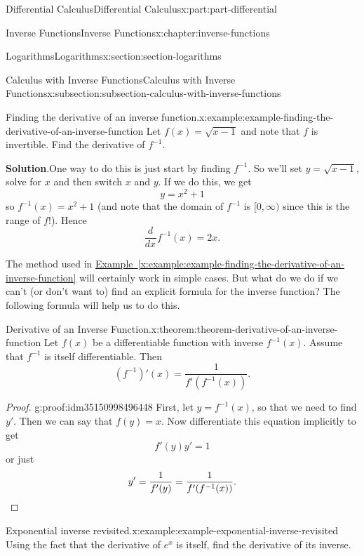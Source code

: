 \documentclass[twoside,10pt,]{book}
\newcommand{\blocktitlefont}{\relax}
\newcommand{\xreffont}{\relax}
\numberwithin{equation}{part}
\newcommand{\qedhere}{\relax}
\newcommand{\dv}[3][]{\dfrac{d^{#1} #2}{d #3^{#1}}}
\begin{document}
\begin{partptx}{Differential Calculus}{}{Differential Calculus}{}{}{x:part:part-differential}
\begin{chapterptx}{Inverse Functions}{}{Inverse Functions}{}{}{x:chapter:inverse-functions}
\begin{sectionptx}{Logarithms}{}{Logarithms}{}{}{x:section:section-logarithms}
\begin{subsectionptx}{Calculus with Inverse Functions}{}{Calculus with Inverse Functions}{}{}{x:subsection:subsection-calculus-with-inverse-functions}
\begin{example}{Finding the derivative of an inverse function.}{x:example:example-finding-the-derivative-of-an-inverse-function}
Let \(f(x) = \sqrt{x-1}\) and note that \(f\) is invertible. Find the derivative of \(f^{-1}\).%
\par\smallskip%
\noindent\textbf{\blocktitlefont Solution}.\hypertarget{g:solution:idm35150998439488}{}\quad{}One way to do this is just start by finding \(f^{-1}\). So we'll set \(y = \sqrt{x-1}\), solve for \(x\) and then switch \(x\) and \(y\). If we do this, we get%
\begin{equation*}
y = x^{2} + 1
\end{equation*}
so \(f^{-1}(x) = x^{2} + 1\) (and note that the domain of \(f^{-1}\) is \([0,\infty)\) since this is the range of \(f\)!). Hence%
\begin{equation*}
\dv{}{x}f^{-1}(x) = 2x.
\end{equation*}
%
\end{example}
The method used in \hyperref[x:example:example-finding-the-derivative-of-an-inverse-function]{Example~{\xreffont\ref{x:example:example-finding-the-derivative-of-an-inverse-function}}} will certainly work in simple cases. But what do we do if we can't (or don't want to) find an explicit formula for the inverse function? The following formula will help us to do this.%
\begin{theorem}{Derivative of an Inverse Function.}{}{x:theorem:theorem-derivative-of-an-inverse-function}%
%
Let \(f(x)\) be a differentiable function with inverse \(f^{-1}(x)\). Assume that \(f^{-1}\) is itself differentiable. Then%
\begin{equation*}
(f^{-1})'(x) = \frac{1}{f'(f^{-1}(x))}.
\end{equation*}
%
\end{theorem}
\begin{proof}{}{g:proof:idm35150998496448}
First, let \(y = f^{-1}(x)\), so that we need to find \(y'\). Then we can say that \(f(y) = x\). Now differentiate this equation implicitly to get%
\begin{equation*}
f'(y)y' = 1
\end{equation*}
or just%
\begin{equation*}
y' = \frac{1}{f'(y)} = \frac{1}{f'(f^{-1}(x))}.\qedhere
\end{equation*}
%
\end{proof}
\begin{example}{Exponential inverse revisited.}{x:example:example-exponential-inverse-revisited}%
Using the fact that the derivative of \(e^{x}\) is itself, find the derivative of its inverse.%
\par\smallskip%

\end{example}
\end{subsectionptx}
\end{sectionptx}
\end{chapterptx}
\end{partptx}
\end{document}
